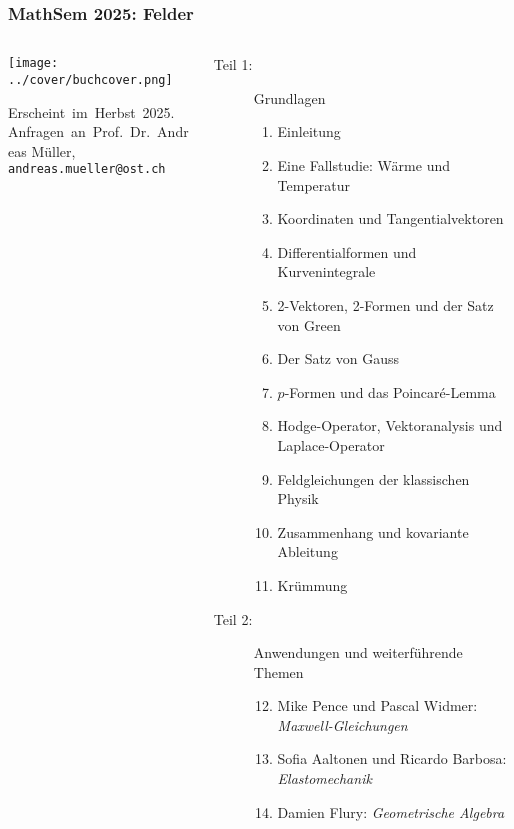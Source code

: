 \documentclass[handout]{beamer}
\title[]{}
\begin{document}
\begin{frame}
\frametitle{%
MathSem 2025: Felder}
\vspace*{-0.1cm}
\begin{columns}[t,onlytextwidth]
\begin{column}{0.37\textwidth}
\begin{center}
\texttt{[image: ../cover/buchcover.png]}
\end{center}
\bigskip
\bigskip
Erscheint~im~Herbst~2025.\\
Anfragen~an~Prof.~Dr.~Andreas Müller,\\
{\texttt{andreas.mueller@ost.ch}}
\bigskip
\bigskip
\bigskip
\end{column}
%
\begin{column}{0.60\textwidth}
\begin{description}
\item[Teil 1:] Grundlagen
\begin{enumerate}
\item Einleitung
\item Eine Fallstudie: Wärme und Temperatur
\item Koordinaten und Tangentialvektoren
\item Differentialformen und Kurvenintegrale
\item 2-Vektoren, 2-Formen und der Satz von Green
\item Der Satz von Gauss
\item $p$-Formen und das Poincaré-Lemma
\item Hodge-Operator, Vektoranalysis und Laplace-Operator
\item Feldgleichungen der klassischen Physik
\item Zusammenhang und kovariante Ableitung
\item Krümmung
\end{enumerate}
\item[Teil 2:] Anwendungen und weiterführende Themen
\begin{enumerate}
\setcounter{enumi}{11}
\item Mike Pence und Pascal Widmer: {\em Maxwell-Gleichungen}
\item Sofia Aaltonen und Ricardo Barbosa: {\em Elastomechanik}
\item Damien Flury: {\em Geometrische Algebra}

\end{enumerate}
\end{description}
\end{column}
\end{columns}
\end{frame}
\end{document}
